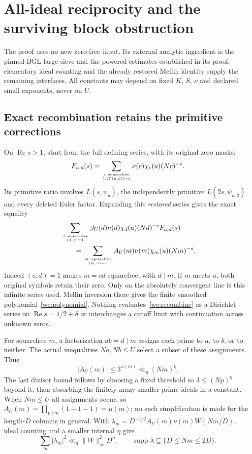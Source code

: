 \section{All-ideal reciprocity and the surviving block obstruction}
\label{wc:details}
The proof uses no new zero-free input. Its external analytic ingredient
is the pinned BGL large sieve and the powered estimates established in
its proof; elementary ideal counting and the already restored Mellin
identity supply the remaining interfaces. All constants may depend on
fixed $K$, $S$, $\nu$ and declared small exponents, never on $U$.

\subsection{Exact recombination retains the primitive corrections}
On $\operatorname{Re}s>1$, start from the full defining series, with
its original zero masks:
\[
 F_{u,d}(s)=\sum_{c\ \mathrm{squarefree}\atop(c,T(u,d))=1}
                 \nu(c)\chi_c(u)(Nc)^{-s}.
\]
Its primitive ratio involves $L(s,\psi_u)$, the independently primitive
$L(2s,\psi_{u,2})$ and every deleted Euler factor. Expanding this
\emph{restored} series gives the exact equality
\begin{align}\label{wc:recombine}
 &\sum_{d\ \mathrm{squarefree}\atop(d,S)=1}
 \beta_U(d)\nu(d)\chi_d(u)(Nd)^{-s}F_{u,d}(s)\notag\\
 &\qquad=\sum_{m\ \mathrm{squarefree}\atop(m,S)=1}
               A_U(m)\nu(m)\chi_m(u)(Nm)^{-s}.
\end{align}
Indeed $(c,d)=1$ makes $m=cd$ squarefree, with $d\mid m$. If $m$
meets $u$, both original symbols retain their zero. Only on the
absolutely convergent line is this infinite series used. Mellin inversion
there gives the finite smoothed polynomial~\eqref{wc:polynomial}.
Nothing evaluates~\eqref{wc:recombine} as a Dirichlet series on
$\operatorname{Re}s=1/2+\delta$ or interchanges a cutoff limit with
continuation across unknown zeros.

For squarefree $m$, a factorization $ab=d\mid m$ assigns each prime
to $a$, to $b$, or to neither. The actual inequalities $Na,Nb\le U$
select a subset of these assignments. Thus
\[
 |A_U(m)|\le3^{\omega(m)}\ll_\eta(Nm)^\eta.
\]
The last divisor bound follows by choosing a fixed threshold so
$3\le(Np)^\eta$ beyond it, then absorbing the finitely many smaller
prime ideals in a constant. When $Nm\le U$ all assignments occur,
so $A_U(m)=\prod_{p\mid m}(1-1-1)=\mu(m)$; no such simplification
is made for the length-$D$ columns in general. With
$\lambda_m=D^{-1/2}A_U(m)\nu(m)W(Nm/D)$, ideal counting and a
smaller internal $\eta$ give
\begin{equation}\label{wc:l2}
 \sum_m|\lambda_m|^2\ll_\eta\|W\|_\infty^2D^\eta,
 \qquad \operatorname{supp}\lambda\subseteq\{D\le Nm\le2D\}.
\end{equation}

